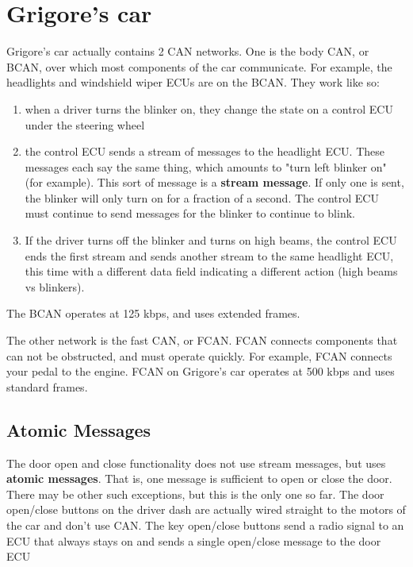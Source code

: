 \documentclass[12pt]{article}
\begin{document}
\section{Grigore's car}
Grigore's car actually contains 2 CAN networks. One is the body CAN, or BCAN,
over which most components of the car communicate. For example, the headlights
and windshield wiper ECUs are on the BCAN. They work like so:
\begin{enumerate}
\item{when a driver turns the blinker on, they change the state on a control
   ECU under the steering wheel}
\item{the control ECU sends a stream of messages to the headlight ECU. These 
   messages each say the same thing, which amounts to "turn left blinker on" 
   (for example). This sort of message is a \textbf{stream message}. If only one is
   sent, the blinker will only turn on for a fraction of a second. The control
   ECU must continue to send messages for the blinker to continue to blink.}
\item{If the driver turns off the blinker and turns on high beams, the control ECU
   ends the first stream and
   sends another stream to the same headlight ECU, this time with a different
   data field indicating a different action (high beams vs blinkers).}
\end{enumerate}
The BCAN operates at 125 kbps, and uses extended frames.

The other network is the fast CAN, or FCAN. FCAN connects components that can
not be obstructed, and must operate quickly. For example, FCAN connects your
pedal to the engine. FCAN on Grigore's car operates at 500 kbps and uses
standard frames. 

\subsection{Atomic Messages}
The door open and close functionality does not use stream messages, but uses
\textbf{atomic messages}. That is, one message is sufficient to open or close the
door. There may be other such exceptions, but this is the only one so far.
The door open/close buttons on the driver dash are actually wired straight to
the motors of the car and don't use CAN. The key open/close buttons send
a radio signal to an ECU that always stays on and sends a single open/close
message to the door ECU
\end{document}
